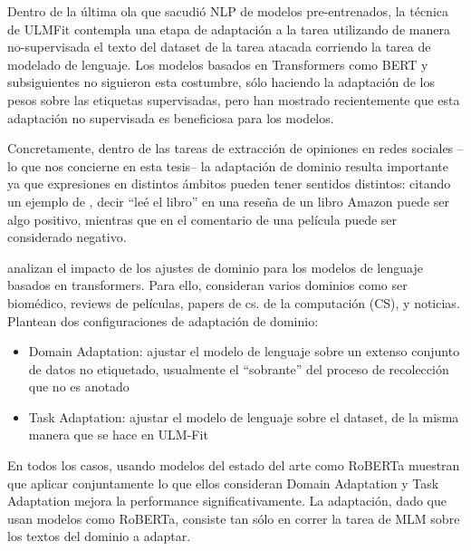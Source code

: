 Dentro de la última ola que sacudió NLP de modelos pre-entrenados, la técnica de ULMFit \cite{howard-ruder-2018-universal} contempla una etapa de adaptación a la tarea utilizando de manera no-supervisada el texto del dataset de la tarea atacada corriendo la tarea de modelado de lenguaje. Los modelos basados en Transformers como BERT \cite{devlin2018bert} y subsiguientes no siguieron esta costumbre, sólo haciendo la adaptación de los pesos sobre las etiquetas supervisadas, pero \citet{gururangan-etal-2020-dont} han mostrado recientemente que esta adaptación no supervisada es beneficiosa para los modelos.

Concretamente, dentro de las tareas de extracción de opiniones en redes sociales --lo que nos concierne en esta tesis-- la adaptación de dominio resulta importante ya que expresiones en distintos ámbitos pueden tener sentidos distintos: citando un ejemplo de \citet{pang2008opinion}, decir ``leé el libro'' en una reseña de un libro Amazon puede ser algo positivo, mientras que en el comentario de una película puede ser considerado negativo.

\citet{gururangan-etal-2020-dont} analizan el impacto de los ajustes de dominio para los modelos de lenguaje basados en transformers. Para ello, consideran varios dominios como ser biomédico, reviews de películas, papers de cs. de la computación (CS), y noticias. Plantean dos configuraciones de adaptación de dominio:

\begin{itemize}
    \item Domain Adaptation: ajustar el modelo de lenguaje sobre un extenso conjunto de datos no etiquetado, usualmente el ``sobrante'' del proceso de recolección que no es anotado
    \item Task Adaptation: ajustar el modelo de lenguaje sobre el dataset, de la misma manera que se hace en ULM-Fit
\end{itemize}

En todos los casos, usando modelos del estado del arte como RoBERTa muestran que aplicar conjuntamente lo que ellos consideran Domain Adaptation y Task Adaptation mejora la performance significativamente. La adaptación, dado que usan modelos como RoBERTa, consiste tan sólo en correr la tarea de MLM sobre los textos del dominio a adaptar.

